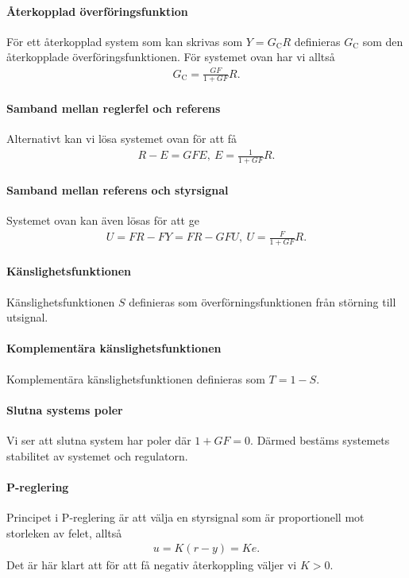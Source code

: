 \paragraph{Återkopplad överföringsfunktion}
För ett återkopplad system som kan skrivas som $Y = G_{\text{C}}R$ definieras $G_{\text{C}}$ som den återkopplade överföringsfunktionen. För systemet ovan har vi alltså
\begin{align*}
	G_{\text{C}} = \frac{GF}{1 + GF}R.
\end{align*}

\paragraph{Samband mellan reglerfel och referens}
Alternativt kan vi lösa systemet ovan för att få
\begin{align*}
	R - E = GFE,\ E = \frac{1}{1 + GF}R.
\end{align*}

\paragraph{Samband mellan referens och styrsignal}
Systemet ovan kan även lösas för att ge
\begin{align*}
	U = FR - FY = FR - GFU,\ U = \frac{F}{1  + GF}R.
\end{align*}

\paragraph{Känslighetsfunktionen}
Känslighetsfunktionen $S$ definieras som överförningsfunktionen från störning till utsignal.

\paragraph{Komplementära känslighetsfunktionen}
Komplementära känslighetsfunktionen definieras som $T = 1 - S$.

\paragraph{Slutna systems poler}
Vi ser att slutna system har poler där $1 + GF = 0$. Därmed bestäms systemets stabilitet av systemet och regulatorn.

\paragraph{P-reglering}
Principet i P-reglering är att välja en styrsignal som är proportionell mot storleken av felet, alltså
\begin{align*}
	u = K(r - y) = Ke.
\end{align*}
Det är här klart att för att få negativ återkoppling väljer vi $K > 0$.


